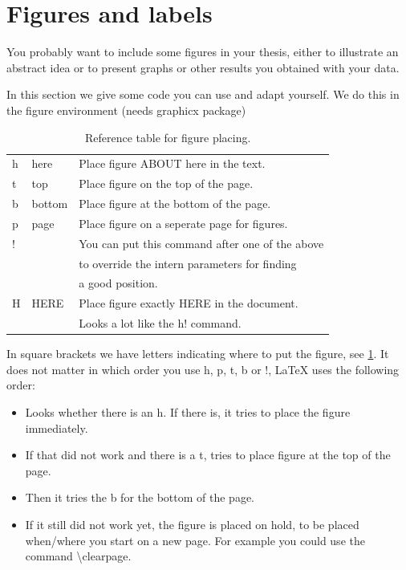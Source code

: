 \documentclass[thesis]{subfiles}
\begin{document}
\section{Figures and labels}
\label{sec:5} %
You probably want to include some figures in your thesis, either to illustrate an abstract idea or to present graphs or other results you obtained with your data.

In this section we give some code you can use and adapt yourself.
We do this in the figure environment (needs graphicx package)
\begin{table}[h]
	\centering
	\begin{tabular}{lll}
		h &	here    & Place figure {ABOUT} here in the text. \\
		t & top     & Place figure on the top of the page. \\
		b & bottom  & Place figure at the bottom of the page. \\
		p &	page    & Place figure on a seperate page for figures. \\
		! &	        & You can put this command after one of the above  \\ 
		&         & to override the intern parameters for finding \\
		&         & a good position. \\
		H & HERE    & Place figure exactly {HERE} in the document. \\
		&         & Looks a lot like the h! command.
	\end{tabular}
	\caption{Reference table for figure placing.}
	\label{tab:location}
\end{table}

In square brackets we have letters indicating where to put the figure, see \ref{tab:location}.
It does not matter in which order you use h, p, t, b or !, \LaTeX{} uses the following order: 
\begin{itemize}
	\item Looks whether there is an h. If there is, it tries to place the figure immediately.
	\item If that did not work and there is a t, tries to place figure at the top of the page.
	\item Then it tries the b for the bottom of the page.
	\item If it still did not work yet, the figure is placed on hold, to be placed when/where you start on a new page. For example you could use the command \textbackslash clearpage.
\end{itemize}
\end{document}
